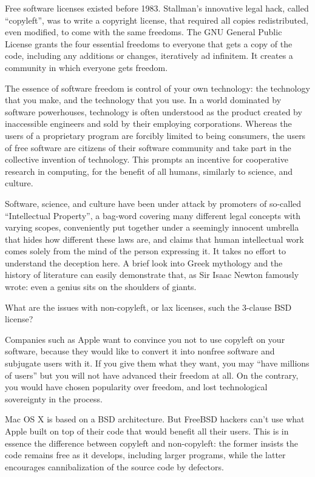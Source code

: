Free software licenses existed before 1983. Stallman's innovative legal
hack, called ``copyleft'', was to write a copyright license, that
required all copies redistributed, even modified, to come with the same
freedoms. The GNU General Public License grants the four essential
freedoms to everyone that gets a copy of the code, including any
additions or changes, iteratively ad infinitem. It creates a community
in which everyone gets freedom.

The essence of software freedom is control of your own technology: the
technology that you make, and the technology that you use. In a world
dominated by software powerhouses, technology is often understood as the
product created by inaccessible engineers and sold by their employing
corporations. Whereas the users of a proprietary program are forcibly
limited to being consumers, the users of free software are citizens of
their software community and take part in the collective invention of
technology. This prompts an incentive for cooperative research in
computing, for the benefit of all humans, similarly to science, and
culture.

Software, science, and culture have been under attack by promoters of
so-called ``Intellectual Property'', a bag-word covering many different
legal concepts with varying scopes, conveniently put together under a
seemingly innocent umbrella that hides how different these laws are, and
claims that human intellectual work comes solely from the mind of the
person expressing it. It takes no effort to understand the deception
here. A brief look into Greek mythology and the history of literature
can easily demonstrate that, as Sir Isaac Newton famously wrote: even a
genius sits on the shoulders of giants.

What are the issues with non-copyleft, or lax licenses, such the
3-clause BSD license?

Companies such as Apple want to convince you not to use copyleft on your
software, because they would like to convert it into nonfree software
and subjugate users with it. If you give them what they want, you may
``have millions of users'' but you will not have advanced their freedom
at all. On the contrary, you would have chosen popularity over freedom,
and lost technological sovereignty in the process.

Mac OS X is based on a BSD architecture. But FreeBSD hackers can't use
what Apple built on top of their code that would benefit all their
users. This is in essence the difference between copyleft and
non-copyleft: the former insists the code remains free as it develops,
including larger programs, while the latter encourages cannibalization
of the source code by defectors.

